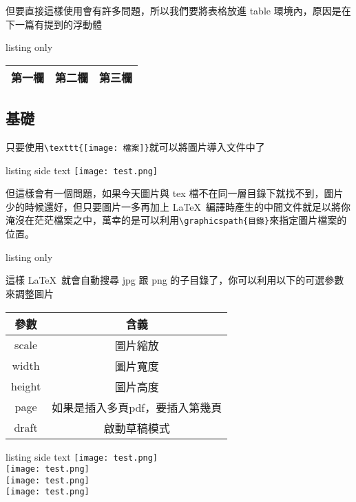 但要直接這樣使用會有許多問題，所以我們要將表格放進 table 環境內，原因是在下一篇有提到的浮動體

\begin{tcblisting}{listing only}
\begin{table}
\begin{tabular}{| c | l r |}
\hline
第一欄 & 第二欄 & 第三欄 \\
\hline
\end{tabular}
\end{table}
\end{tcblisting}

\subsection{基礎}

只要使用\verb|\texttt{[image: 檔案]}|就可以將圖片導入文件中了

\begin{tcblisting}{listing side text}
\texttt{[image: test.png]}
\end{tcblisting}

但這樣會有一個問題，如果今天圖片與 tex 檔不在同一層目錄下就找不到，圖片少的時候還好，但只要圖片一多再加上 \LaTeX\ 編譯時產生的中間文件就足以將你淹沒在茫茫檔案之中，萬幸的是可以利用\verb|\graphicspath{目錄}|來指定圖片檔案的位置。

\begin{tcblisting}{listing only}
\graphicspath{{jpg/}{png/}}
\end{tcblisting}

這樣 \LaTeX\ 就會自動搜尋 jpg 跟 png 的子目錄了，你可以利用以下的可選參數來調整圖片

\begin{tabular}{cc}
\hline
參數 & 含義 \\\hline\hline
scale & 圖片縮放 \\\hline
width & 圖片寬度 \\\hline
height & 圖片高度 \\\hline
page & 如果是插入多頁pdf，要插入第幾頁 \\\hline
draft & 啟動草稿模式 \\\hline
\end{tabular}

\begin{tcblisting}{listing side text}
\texttt{[image: test.png]}\\
\texttt{[image: test.png]}\\
\texttt{[image: test.png]}\\
\texttt{[image: test.png]}
\end{tcblisting}

